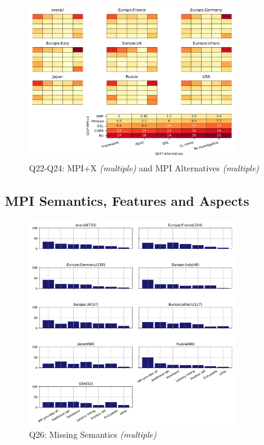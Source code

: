 \documentclass[conference,10pt,letterpaper]{IEEEtran}
\begin{document}
\begin{figure}[htb]
\begin{center}
\includegraphics[width=9cm]{Figs/Q22-Q24.pdf}
\caption{Q22-Q24: MPI+X {\it(multiple)} and MPI Alternatives {\it(multiple)}}
\label{fig:mpi-x-and-alternatives}
\end{center}
\end{figure}

\subsection{MPI Semantics, Features and Aspects}

\begin{figure}[htb]
\begin{center}
\includegraphics[width=9cm]{Figs/Q26.pdf}
\caption{Q26: Missing Semantics {\it(multiple)}}
\label{fig:missing-semantics}
\end{center}
\end{figure}
\end{document}

